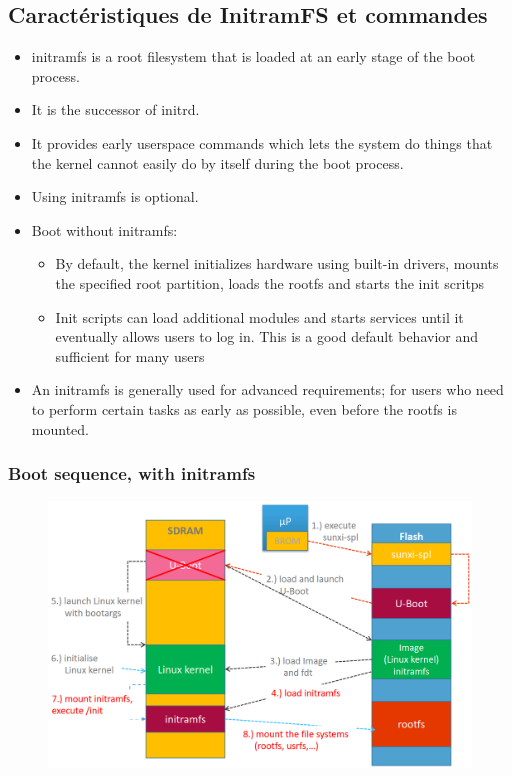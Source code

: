 \documentclass[resume]{subfiles}
\begin{document}
\subsection{Caractéristiques de InitramFS et commandes}

\begin{itemize}
\item initramfs is a root filesystem that is loaded at an early stage of the boot
process.
\item It is the successor of initrd.
\item It provides early userspace commands which lets the system do things that
the kernel cannot easily do by itself during the boot process.
\item Using initramfs is optional.
\item Boot without initramfs:
\begin{itemize}
\item By default, the kernel initializes hardware using built-in drivers, mounts the specified root partition, loads the rootfs and starts the init scritps
\item Init scripts can load additional modules and starts services until it eventually allows users to log in. This is a good default behavior and sufficient for many users
\end{itemize}
\item An initramfs is generally used for advanced requirements; for users who need to perform certain tasks as early as possible, even before the rootfs is mounted.
\end{itemize}

\subsubsection{Boot sequence, with initramfs}

\begin{figure}[H]
    \centering
    \includegraphics[width=1\columnwidth]{Figures/fileSystem/initRamFsBootSeq.png}
    \label{fig:initRamFsBootSeq}
\end{figure}
\end{document}
